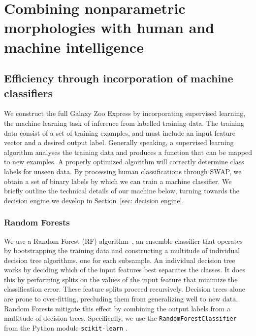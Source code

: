 
\chapter{Combining nonparametric morphologies with human and machine intelligence}
\label{chap:4}



\section{Efficiency through incorporation of machine classifiers} \label{sec: machine}

We construct the full Galaxy Zoo Express by incorporating supervised 
learning, the machine learning task of inference from labelled training data. 
The training data consist of a set of training examples, and must include
an input feature vector and a desired output label.  Generally speaking,
a supervised learning algorithm analyses the training data and produces a 
function that can be mapped to new examples. A properly optimized algorithm will 
correctly determine class labels for unseen data. By processing human classifications 
through SWAP, we obtain a set of binary labels by which we can train a machine 
classifier. We briefly outline the technical details of our machine below,  turning
towards the decision engine we develop in Section~\ref{sec: decision engine}. 



\subsection{Random Forests}
We use a Random Forest (RF) algorithm~\citep{Breiman2001},  
an ensemble classifier that operates by
 bootstrapping the training data and constructing a multitude of individual decision 
tree algorithms, one for each subsample.  
An individual decision tree works by deciding which of 
the input features best separates the classes. It does this by performing 
splits on the values of the input feature that minimize the classification 
error. These feature splits proceed recursively. Decision trees alone are
 prone to over-fitting, precluding them from generalizing 
well to new data. Random Forests mitigate this effect by combining the 
output labels from a multitude of decision trees.  Specifically, we use the 
\texttt{RandomForestClassifier} from the Python module \texttt{scikit-learn}
\citep{scikit-learn}. 


